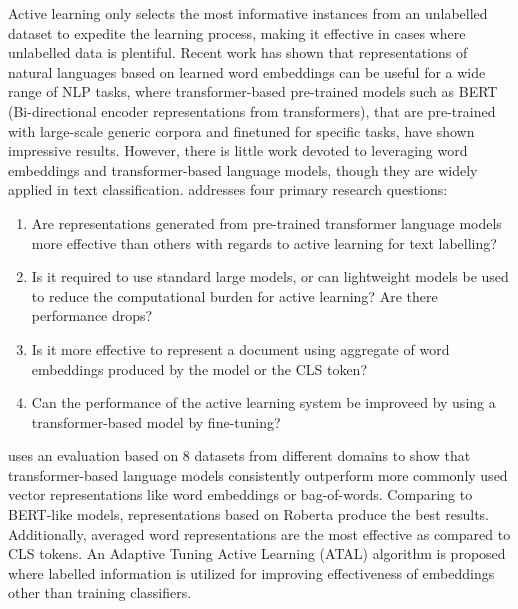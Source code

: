 Active learning only selects the most informative instances from an unlabelled dataset
to expedite the learning process, making it effective in cases where unlabelled data is 
plentiful. Recent work has shown that representations of natural languages based on 
learned word embeddings can be useful for a wide range of NLP tasks, where 
transformer-based pre-trained models such as BERT (Bi-directional encoder representations 
from transformers), that are pre-trained with large-scale generic corpora and finetuned 
for specific tasks, have shown impressive results. However, there is little work devoted to 
leveraging word embeddings and transformer-based language models, though they are widely 
applied in text classification. \cite{lu2020investigating} addresses four primary research 
questions: 
\begin{enumerate}
    \item Are representations generated from pre-trained transformer language models more 
        effective than others with regards to active learning for text labelling?
    \item Is it required to use standard large models, or can lightweight models be used to 
        reduce the computational burden for active learning? Are there performance drops?
    \item Is it more effective to represent a document using aggregate of word embeddings 
        produced by the model or the CLS token? 
    \item Can the performance of the active learning system be improveed by using a 
        transformer-based model by fine-tuning? 
\end{enumerate}

\cite{lu2020investigating} uses an evaluation based on 8 datasets from different domains
to show that transformer-based language models consistently outperform more commonly used 
vector representations like word embeddings or bag-of-words. Comparing to BERT-like models, 
representations based on Roberta produce the best results. Additionally, averaged word 
representations are the most effective as compared to CLS tokens. An Adaptive Tuning 
Active Learning (ATAL) algorithm is proposed where labelled information is utilized for 
improving effectiveness of embeddings other than training classifiers. 